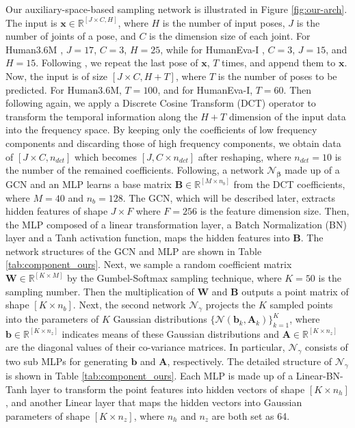 \documentclass[sigconf,screen,nonacm]{acmart}
\begin{document}
	
	Our auxiliary-space-based sampling network is illustrated in Figure \ref{fig:our-arch}. The input is $\mathbf{x}\in\mathbb{R}^{[J\times C, H]}$, where $H$ is the number of input poses, $J$ is the number of joints of a pose, and $C$ is the dimension size of each joint. For Human3.6M \cite{ionescu2013human3}, $J=17$, $C=3$, $H=25$, while for HumanEva-I \cite{sigal2010humaneva}, $C=3$, $J=15$, and $H=15$.
	Following \cite{mao2019learning}, we repeat the last pose of $\mathbf{x}$, $T$ times, and append them to $\mathbf{x}$. Now, the input is of size $[J\times C, H+T]$, where $T$ is the number of poses to be predicted. 
For Human3.6M, $T = 100$, and for HumanEva-I, $T = 60$.
	Then following \cite{mao2019learning} again, we apply a Discrete Cosine Transform (DCT) operator to
transform the temporal information along the $H+T$ dimension of the input data into the frequency space. By keeping only the coefficients of low frequency components and discarding those of high frequency components, we obtain data of $[J\times C, n_{dct}]$ which becomes $[J, C\times n_{dct}]$ after reshaping, where $n_{dct} = 10$ is the number of the remained coefficients.
	Following, a network $\mathbf{\mathcal{N}_{\beta}}$ made up of a GCN and an MLP learns a base matrix $\mathbf{B} \in \mathbb{R}^{[M \times n_b]}$ from the DCT coefficients, where $M = 40$ and $n_b=128$.
The GCN, which will be described later, extracts hidden features of shape $J \times F$ where $F = 256$ is the feature dimension size. Then, the MLP composed of a linear transformation layer, a Batch Normalization (BN) layer and a Tanh activation function, maps the hidden features into $\mathbf{B}$. The network structures of the GCN and MLP are shown in Table \ref{tab:component_ours}.
	Next, we sample a random coefficient matrix $\mathbf{W} \in \mathbb{R}^{[K \times M]}$ by the Gumbel-Softmax sampling technique, where $K=50$ is the sampling number. Then the multiplication of $\mathbf{W}$ and $\mathbf{B}$ outputs a point matrix of shape $[K \times n_b]$.
	Next, the second network $\mathcal{N}_{\gamma}$ projects the $K$ sampled points into the parameters of $K$ Gaussian distributions $\{\mathcal{N}( \mathbf{b}_k, \mathbf{A}_k )\}_{k=1}^{K}$, where $\mathbf{b} \in \mathbb{R}^{[K \times n_z]}$ indicates means of these Gaussian distributions and $\mathbf{A} \in \mathbb{R}^{[K \times n_z]}$ are the diagonal values of their co-variance matrices.
	In particular, $\mathcal{N}_{\gamma}$ consists of two sub MLPs for generating $\mathbf{b}$ and $\mathbf{A}$, respectively. The detailed structure of $\mathcal{N}_{\gamma}$ is shown in Table \ref{tab:component_ours}. Each MLP is made up of a Linear-BN-Tanh layer to transform the point features into hidden vectors of shape $[K \times n_h]$, and another Linear layer that maps the hidden vectors into Gaussian parameters of shape $[K \times n_z]$, where $n_h$ and $n_z$ are both set as 64.
\end{document}
